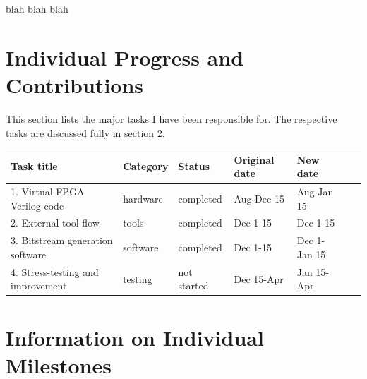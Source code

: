 \documentclass[12pt,letterpaper]{article}
\begin{document}
blah blah blah


\pagebreak
{}




\section{Individual Progress and Contributions}

This section lists the major tasks I have been responsible for.
The respective tasks are discussed fully in section 2.

\begin{tabular}{|l|l|l|l|l|l|l|}
\hline
\textbf{Task title} & \textbf{Category} & \textbf{Status} & \textbf{Original date} & \textbf{New date} \\ \hline
\hline
1. Virtual FPGA Verilog code & hardware & completed & Aug-Dec 15 & Aug-Jan 15 \\ \hline
2. External tool flow & tools & completed & Dec 1-15 & Dec 1-15 \\ \hline
3. Bitstream generation software & software & completed & Dec 1-15 & Dec 1-Jan 15 \\ \hline
4. Stress-testing and improvement & testing & not started & Dec 15-Apr & Jan 15-Apr \\ \hline
\end{tabular}




\section{Information on Individual Milestones}
\end{document}
